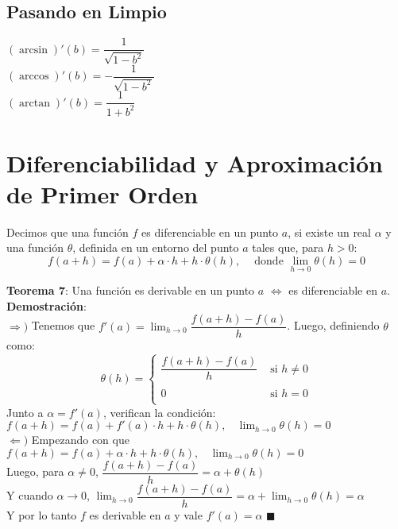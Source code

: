 \documentclass[11pt,a4paper]{article}
\newcommand*{\QEDA}{\null\nobreak\hfill\ensuremath{\blacksquare}}
\begin{document}
\subsection{Pasando en Limpio}
\begin{multicols}{3}
$(\arcsin)'(b) = \dfrac{1}{\sqrt{1 - b^2}}$\\
$(\arccos)'(b) = -\dfrac{1}{\sqrt{1 - b^2}}$\\
$(\arctan)'(b) = \dfrac{1}{1 + b^2}$\\
\end{multicols}

\section{Diferenciabilidad y Aproximaci\'on de Primer Orden}
Decimos que una funci\'on $f$ es diferenciable en un punto $a$, si existe un real $\alpha$ y una funci\'on $\theta$, definida en un entorno del punto $a$ tales que, para $h>0$: $$f(a+h) = f(a) + \alpha\cdot h + h \cdot \theta(h),\ \ \ \ \text{ donde } \displaystyle{\lim_{h \to 0} \theta(h) = 0}$$


\noindent \textbf{Teorema 7}: Una funci\'on es derivable en un punto $a$ $\iff$ es diferenciable en $a$.\\
\textbf{Demostraci\'on}:\\
$\Rightarrow)$ Tenemos que $f'(a)=\displaystyle{\lim_{h \to 0} \dfrac{f(a+h)-f(a)}{h}}$. Luego, definiendo $\theta$ como:
$$\theta(h) = \left\{ \begin{array}{cl}
\dfrac{f(a+h)-f(a)}{h} & \text{ si } h\not=0\\ \\
0 & \text{ si } h=0\\
\end{array}\right.$$
Junto a $\alpha = f'(a)$, verifican la condici\'on: $f(a+h)=f(a)+f'(a) \cdot h + h \cdot \theta(h),\ \ \ \ \displaystyle{\lim_{h \to 0} \theta(h) = 0}$\\
$\Leftarrow)$ Empezando con que $f(a+h) = f(a) + \alpha \cdot h + h \cdot \theta(h),\ \ \ \ \displaystyle{\lim_{h \to 0} \theta(h) = 0}$\\
Luego, para $\alpha \not = 0$, $\dfrac{f(a+h)-f(a)}{h} = \alpha + \theta(h)$\\

Y cuando $\alpha \to 0$, $\displaystyle{\lim_{h \to 0} \dfrac{f(a+h)-f(a)}{h} = \alpha + \lim_{h\to 0} \theta(h) = \alpha}$\\

Y por lo tanto $f$ es derivable en $a$ y vale $f'(a) = \alpha$ \QEDA\\
\end{document}
